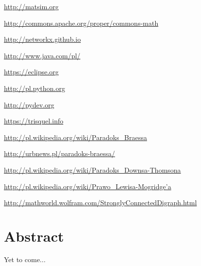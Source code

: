 \documentclass[twoside,12pt]{report}
\let\oldsection\chapter
\def\chapter{\cleardoublepage\oldsection}
\begin{document}
\begin{thebibliography}{99}
	\url{http://matsim.org}	

	\url{http://commons.apache.org/proper/commons-math}
	
	\url{http://networkx.github.io}

	\url{http://www.java.com/pl/}

	\url{https://eclipse.org}
				
	\url{http://pl.python.org}
	
	\url{http://pydev.org}
	
	\url{https://trisquel.info}
			
	\url{http://pl.wikipedia.org/wiki/Paradoks_Braessa}
	
	\url{http://urbnews.pl/paradoks-braessa/}
	
	\url{http://pl.wikipedia.org/wiki/Paradoks_Downsa-Thomsona}
	
	\href{http://pl.wikipedia.org/wiki/Prawo_Lewisa-Mogridge\%E2\%80\%99a}
	    {http://pl.wikipedia.org/wiki/Prawo\_Lewisa-Mogridge\textquoteright{}a}
	   
	\url{http://mathworld.wolfram.com/StronglyConnectedDigraph.html}

\end{thebibliography}

\cleardoublepage
{}
{}
\chapter*{Abstract}


Yet to come...
\end{document}

